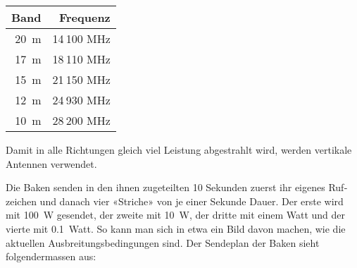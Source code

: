 \vspace{1em}
\begin{tabular}{r r}
\bfseries Band & \bfseries Frequenz \\ \toprule
20 m & 14 100 MHz \\ \midrule                                                                                                                                                                 
17 m & 18 110 MHz \\ \midrule                                                                                                                                                                 
15 m & 21 150 MHz \\ \midrule                                                                                                                                                                 
12 m & 24 930 MHz \\ \midrule                                                                                                                                                                 
10 m & 28 200 MHz \\ \midrule
\end{tabular}
\vspace{1em}

Damit in alle Richtungen gleich viel Leistung abgestrahlt wird, werden vertikale Antennen ver­wendet. 

Die Baken senden in den ihnen zugeteilten 10 Sekunden zuerst ihr eigenes Ruf­zeichen und danach vier «Striche» von je einer Sekunde Dauer. Der erste wird mit 100 W gesendet, der zweite mit 10 W, der dritte mit einem Watt und der vierte mit 0.1 Watt. So kann man sich in etwa ein Bild davon machen, wie die aktuellen Ausbreitungsbedingungen sind.
Der Sendeplan der Baken sieht folgendermassen aus:


